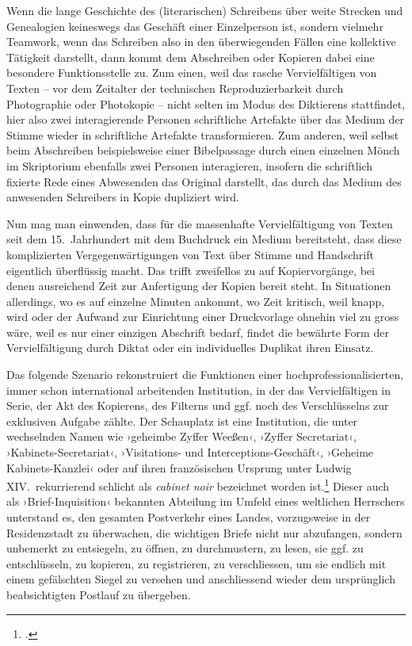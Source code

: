 \documentclass[a4paper,10pt]{article}
\newcommand{\inanf}[1]{›#1‹}
\begin{document}
Wenn die lange Geschichte des (literarischen) Schreibens über weite Strecken und Genealogien keineswegs das Geschäft einer Einzelperson ist, sondern vielmehr Teamwork, wenn das Schreiben also in den überwiegenden Fällen eine kollektive Tätigkeit darstellt, dann kommt dem Abschreiben oder Kopieren dabei eine besondere Funktionsstelle zu. Zum einen, weil das rasche Vervielfältigen von Texten – vor dem Zeitalter der technischen Reproduzierbarkeit durch Photographie oder Photokopie – nicht selten im Modus des Diktierens stattfindet, hier also zwei interagierende Personen schriftliche Artefakte über das Medium der Stimme wieder in schriftliche Artefakte transformieren. Zum anderen, weil selbst beim Abschreiben beispielsweise einer Bibelpassage durch einen einzelnen Mönch im Skriptorium ebenfalls zwei Personen interagieren, insofern die schriftlich fixierte Rede eines Abwesenden das Original darstellt, das durch das Medium des anwesenden Schreibers in Kopie dupliziert wird. 

Nun mag man einwenden, dass für die massenhafte Vervielfältigung von Texten seit dem 15.~Jahrhundert mit dem Buchdruck ein Medium bereitsteht, dass diese komplizierten Vergegenwärtigungen von Text über Stimme und Handschrift eigentlich überflüssig macht. Das trifft zweifellos zu auf Kopiervorgänge, bei denen ausreichend Zeit zur Anfertigung der Kopien bereit steht. In Situationen allerdings, wo es auf einzelne Minuten ankommt, wo Zeit kritisch, weil knapp, wird oder der Aufwand zur Einrichtung einer Druckvorlage ohnehin viel zu gross wäre, weil es nur einer einzigen Abschrift bedarf, findet die bewährte Form der Vervielfältigung durch Diktat oder ein individuelles Duplikat ihren Einsatz.

Das folgende Szenario rekonstruiert die Funktionen einer hochprofessionalisierten, immer schon international arbeitenden Institution, in der das Vervielfältigen in Serie, der Akt des Kopierens, des Filterns und ggf. noch des Verschlüsselns zur exklusiven Aufgabe zählte. Der Schauplatz ist eine Institution, die unter wechselnden Namen wie \inanf{geheimbe Zyffer Weeßen}, \inanf{Zyffer Secretariat}, \inanf{Kabinets-Secretariat}, \inanf{Visitations- und Interceptions-Geschäft}, \inanf{Geheime Kabinets-Kanzlei} oder auf ihren französischen Ursprung unter Ludwig XIV.\ rekurrierend schlicht als \emph{cabinet noir} bezeichnet worden ist.\footcite[134]{leeuw:1999} Dieser auch als \inanf{Brief-Inquisition} bekannten Abteilung im Umfeld eines weltlichen Herrschers unterstand es, den gesamten Postverkehr eines Landes, vorzugsweise in der Residenzstadt zu überwachen, die wichtigen Briefe nicht nur abzufangen, sondern unbemerkt zu entsiegeln, zu öffnen, zu durchmustern, zu lesen, sie ggf. zu entschlüsseln, zu kopieren, zu registrieren, zu verschliessen, um sie endlich mit einem gefälschten Siegel zu versehen und anschliessend wieder dem ursprünglich beabsichtigten Postlauf zu übergeben.
\end{document}
